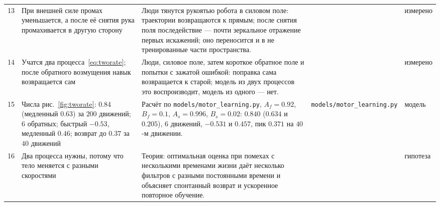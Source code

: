{\begin{longtable}{>{\raggedright}p{0.5cm}>{\raggedright}p{4.0cm}>{\raggedright}p{5.6cm}>{\raggedright}p{2.3cm}>{\raggedright\arraybackslash}p{1.7cm}}
13 & При внешней силе промах уменьшается, а после её снятия рука промахивается в другую сторону & Люди тянутся рукоятью робота в силовом поле: траектории возвращаются к прямым; после снятия поля последействие --- почти зеркальное отражение первых искажений; оно переносится и в не тренированные части пространства. & \cite{ShadmehrMussaIvaldi1994} & измерено \\
14 & Учатся два процесса~\eqref{eq:tworate}; после обратного возмущения навык возвращается сам & Люди, силовое поле, затем короткое обратное поле и попытки с зажатой ошибкой: поправка сама возвращается к старой; модель из двух процессов это воспроизводит, модель из одного --- нет. & \cite{Smith2006} & измерено \\
15 & Числа рис.~\ref{fig:tworate}: $0.84$ (медленный $0.63$) за $200$ движений; $6$ обратных; быстрый $-0.53$, медленный $0.46$; возврат до $0.37$ за $40$ движений & Расчёт по \texttt{models/\allowbreak motor\_\allowbreak learning.py}, $A_f=0.92$, $B_f=0.1$, $A_s=0.996$, $B_s=0.02$: $0.840$ ($0.634$ и $0.205$), $6$ движений, $-0.531$ и $0.457$, пик $0.371$ на $40$-м движении. & \texttt{models/\allowbreak motor\_\allowbreak learning.py} & модель \\
16 & Два процесса нужны, потому что тело меняется с разными скоростями & Теория: оптимальная оценка при помехах с несколькими временами жизни даёт несколько фильтров с разными постоянными времени и объясняет спонтанный возврат и ускоренное повторное обучение. & \cite{Kording2007} & гипотеза \\
\bottomrule
\end{longtable}}
